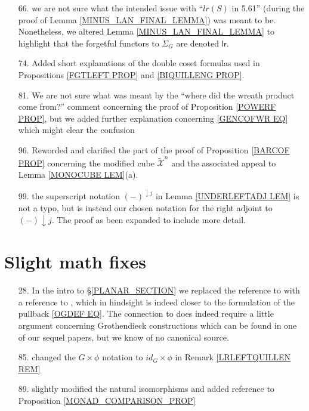 \documentclass{article}
\begin{document}
\begin{itemize}
	\item[66.] we are not sure what the intended issue with 
	``$lr(S)$ in 5.61'' 
	(during the proof of Lemma \ref{MINUS_LAN_FINAL_LEMMA})
	was meant to be.
	Nonetheless, we altered 
	Lemma \ref{MINUS_LAN_FINAL_LEMMA}
	to highlight that the forgetful functors to $\Sigma_G$
	are denoted $\mathsf{lr}$.

	\item[74.] Added short explanations of the double coset formulas used in 
	Propositions \ref{FGTLEFT PROP} and \ref{BIQUILLENG PROP}.
	
	\item[81.] We are not sure what was meant by the 
	``where did the wreath product come from?'' comment
	concerning the proof of Proposition \ref{POWERF PROP},
	but we added further explanation concerning
	\eqref{GENCOFWR EQ} which might clear the confusion
	
	\item[96.] Reworded and clarified the part of the proof of 
	Proposition \ref{BARCOF PROP}
	concerning the modified cube 
	$\tilde{\mathcal{X}}^n$
	and the associated appeal to 
	Lemma \ref{MONOCUBE LEM}(a).
	
	\item[99.] the superscript notation $(-)^{\downarrow j}$
	in Lemma \ref{UNDERLEFTADJ LEM}
	is not a typo, but is instead our chosen notation for the right adjoint to $(-)\downarrow j$.
	The proof as been expanded to include more detail.
\end{itemize} 

\section{Slight math fixes}

\begin{itemize}
	\item[28.] In the intro to \S \ref{PLANAR_SECTION}
	we replaced the reference to 
	\cite[Prop. 5.47]{Pe17}
	with a reference to 
	\cite[Def. 5.44]{Pe17},
	which in hindsight is indeed closer 
	to the formulation of the pullback \eqref{OGDEF EQ}.
	The connection to \cite[Prop. 5.47]{Pe17}
	does indeed require a little argument concerning Grothendieck constructions {\color{red} which can be found in one of our sequel papers}, 
	but we know of no canonical source.
	
	\item[85.] changed the $G \times \phi$ notation 
	to $id_G \times \phi$ in Remark \ref{LRLEFTQUILLEN REM}
	
	\item[89.] slightly modified the natural isomorphisms and added reference to Proposition \ref{MONAD_COMPARISON_PROP} 
\end{itemize}
\end{document}
